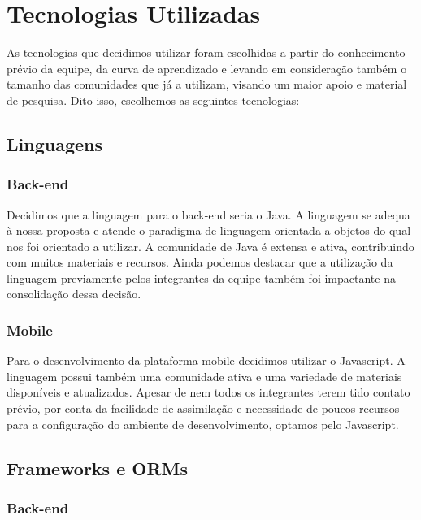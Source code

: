 \section{Tecnologias Utilizadas}

As tecnologias que decidimos utilizar foram escolhidas a partir do conhecimento prévio da equipe, da curva de aprendizado e levando em consideração também o tamanho das comunidades que já a utilizam, visando um maior apoio e material de pesquisa.
Dito isso, escolhemos as seguintes tecnologias:

\subsection{Linguagens}

\subsubsection{Back-end}

Decidimos que a linguagem para o back-end seria o Java. A linguagem se adequa à nossa proposta e atende o paradigma de linguagem orientada a objetos do qual nos foi orientado a utilizar. 
A comunidade de Java é extensa e ativa, contribuindo com muitos materiais e recursos. Ainda podemos destacar que a utilização da linguagem previamente pelos integrantes da equipe também foi impactante na consolidação dessa decisão.

\subsubsection{Mobile}
Para o desenvolvimento da plataforma mobile decidimos utilizar o Javascript. A linguagem possui também uma comunidade ativa e uma variedade de materiais disponíveis e atualizados. Apesar de nem todos os integrantes terem tido contato prévio, por conta da facilidade de assimilação e necessidade de poucos recursos para a configuração do ambiente de desenvolvimento, optamos pelo Javascript.

\subsection{Frameworks e ORMs}

\subsubsection{Back-end}

